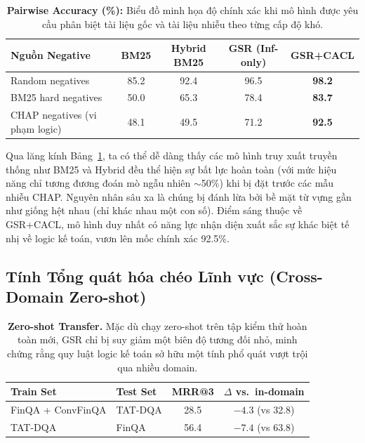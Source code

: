 \documentclass[10pt, a4paper]{article}
\begin{document}
\begin{table}[H]
\centering\small
\begin{tabular}{lcccc}
\toprule
Nguồn Negative & BM25 & Hybrid BM25 & GSR (Inf-only) & \textbf{GSR+CACL} \\
\midrule
Random negatives & 85.2 & 92.4 & 96.5 & \textbf{98.2} \\
BM25 hard negatives & 50.0 & 65.3 & 78.4 & \textbf{83.7} \\
CHAP negatives (vi phạm logic) & 48.1 & 49.5 & 71.2 & \textbf{92.5} \\
\bottomrule
\end{tabular}
\caption{\textbf{Pairwise Accuracy (\%):} Biểu đồ minh họa độ chính xác khi mô hình được yêu cầu phân biệt tài liệu gốc và tài liệu nhiễu theo từng cấp độ khó.}
\label{tab:chap_analysis}
\end{table}

Qua lăng kính Bảng~\ref{tab:chap_analysis}, ta có thể dễ dàng thấy các mô hình truy xuất truyền thống như BM25 và Hybrid đều thể hiện sự bất lực hoàn toàn (với mức hiệu năng chỉ tương đương đoán mò ngẫu nhiên $\sim$50\%) khi bị đặt trước các mẫu nhiễu CHAP. Nguyên nhân sâu xa là chúng bị đánh lừa bởi bề mặt từ vựng gần như giống hệt nhau (chỉ khác nhau một con số). Điểm sáng thuộc về GSR+CACL, mô hình duy nhất có năng lực nhận diện xuất sắc sự khác biệt tế nhị về logic kế toán, vươn lên mốc chính xác 92.5\%.

\subsection{Tính Tổng quát hóa chéo Lĩnh vực (Cross-Domain Zero-shot)}

\begin{table}[H]
\centering\small
\begin{tabular}{llcc}
\toprule
Train Set & Test Set & MRR@3 & $\Delta$ vs.\ in-domain \\
\midrule
FinQA + ConvFinQA & TAT-DQA & 28.5 & $-4.3$ (vs 32.8) \\
TAT-DQA & FinQA & 56.4 & $-7.4$ (vs 63.8) \\
\bottomrule
\end{tabular}
\caption{\textbf{Zero-shot Transfer.} Mặc dù chạy zero-shot trên tập kiểm thử hoàn toàn mới, GSR chỉ bị suy giảm một biên độ tương đối nhỏ, minh chứng rằng quy luật logic kế toán sở hữu một tính phổ quát vượt trội qua nhiều domain.}
\label{tab:cross_domain}
\end{table}
\end{document}
